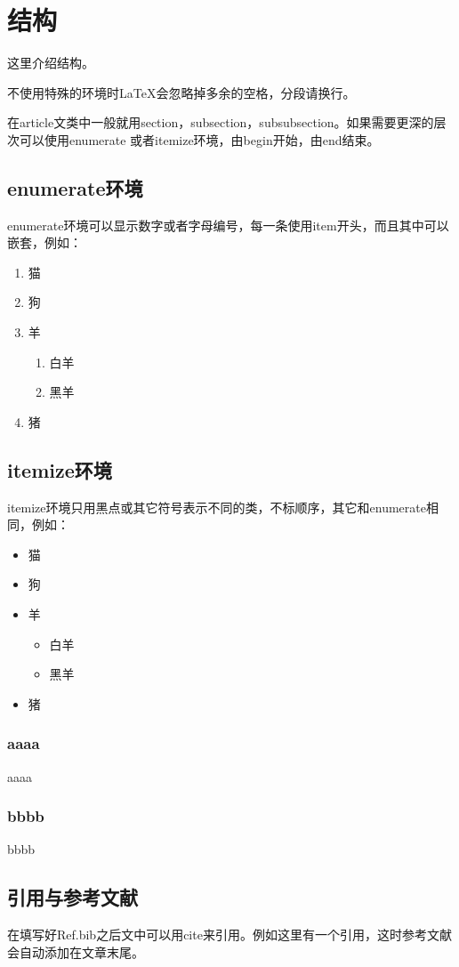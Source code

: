 \section{结构}
这里介绍结构。

不使用特殊的环境时\LaTeX 会忽略掉多余的空格，分段请换行。

在article文类中一般就用section，subsection，subsubsection。如果需要更深的层次可以使用enumerate 或者itemize环境，由begin开始，由end结束。



\subsection{enumerate环境}

enumerate环境可以显示数字或者字母编号，每一条使用item开头，而且其中可以嵌套，例如：
\begin{enumerate}
  \item 猫
  \item 狗
  \item 羊
  \begin{enumerate}
    \item 白羊
    \item 黑羊
  \end{enumerate}
  \item 猪
\end{enumerate}

\subsection{itemize环境}

itemize环境只用黑点或其它符号表示不同的类，不标顺序，其它和enumerate相同，例如：

\begin{itemize}
  \item 猫
  \item 狗
  \item 羊
  \begin{itemize}
    \item 白羊
    \item 黑羊
  \end{itemize}
  \item 猪
\end{itemize}

\subsubsection{aaaa}

aaaa

\subsubsection{bbbb}

bbbb

\subsection{引用与参考文献}
在填写好Ref.bib之后文中可以用cite来引用。例如这里有一个引用\cite{00-el-yariv-relation-coup}，这时参考文献会自动添加在文章末尾。
